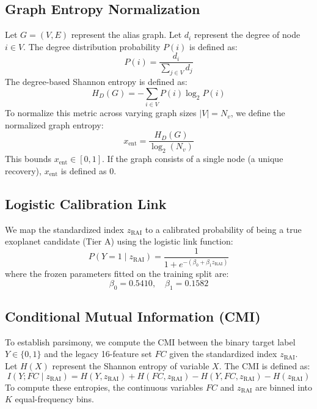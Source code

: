 \subsection{Graph Entropy Normalization} \label{sec:app_entropy_norm}
Let $G = (V, E)$ represent the alias graph. Let $d_i$ represent the degree of node $i \in V$. The degree distribution probability $P(i)$ is defined as:
\begin{equation}
P(i) = \frac{d_i}{\sum_{j \in V} d_j}
\label{eq:app_prob_degree}
\end{equation}
The degree-based Shannon entropy is defined as:
\begin{equation}
H_D(G) = -\sum_{i \in V} P(i) \log_2 P(i)
\label{eq:app_shannon_entropy}
\end{equation}
To normalize this metric across varying graph sizes $|V| = N_v$, we define the normalized graph entropy:
\begin{equation}
x_{\text{ent}} = \frac{H_D(G)}{\log_2(N_v)}
\label{eq:app_norm_entropy}
\end{equation}
This bounds $x_{\text{ent}} \in [0, 1]$. If the graph consists of a single node (a unique recovery), $x_{\text{ent}}$ is defined as 0.

\subsection{Logistic Calibration Link} \label{sec:app_logistic_link}
We map the standardized index $z_{\text{RAI}}$ to a calibrated probability of being a true exoplanet candidate (Tier A) using the logistic link function:
\begin{equation}
P(Y = 1 \mid z_{\text{RAI}}) = \frac{1}{1 + e^{-(\beta_0 + \beta_1 z_{\text{RAI}})}}
\label{eq:app_logistic_link}
\end{equation}
where the frozen parameters fitted on the training split are:
\begin{equation}
\beta_0 = 0.5410, \quad \beta_1 = 0.1582
\label{eq:app_betas}
\end{equation}

\subsection{Conditional Mutual Information (CMI)} \label{sec:app_cmi}
To establish parsimony, we compute the CMI between the binary target label $Y \in \{0, 1\}$ and the legacy 16-feature set $FC$ given the standardized index $z_{\text{RAI}}$. Let $H(X)$ represent the Shannon entropy of variable $X$. The CMI is defined as:
\begin{equation}
I(Y; FC \mid z_{\text{RAI}}) = H(Y, z_{\text{RAI}}) + H(FC, z_{\text{RAI}}) - H(Y, FC, z_{\text{RAI}}) - H(z_{\text{RAI}})
\label{eq:app_cmi_entropy}
\end{equation}
To compute these entropies, the continuous variables $FC$ and $z_{\text{RAI}}$ are binned into $K$ equal-frequency bins.

